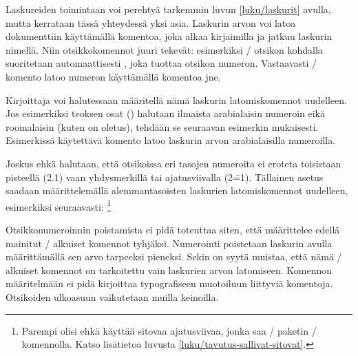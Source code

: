 Laskureiden toimintaan voi perehtyä tarkemmin luvun \ref{luku/laskurit}
avulla, mutta kerrataan tässä yhteydessä yksi asia. Laskurin arvon voi
latoa dokumenttiin käyttämällä komentoa, joka alkaa kirjaimilla
 ja jatkuu laskurin nimellä. Niin otsikkokomennot juuri
tekevät: esimerkiksi \-/ otsikon kohdalla suoritetaan
automaattisesti , joka tuottaa otsikon numeron.
Vastaavasti \-/ komento latoo numeron käyttämällä
komentoa  jne.

Kirjoittaja voi halutessaan määritellä nämä laskurin latomiskomennot
uudelleen. Jos esimerkiksi teoksen osat () halutaan
ilmaista arabialaisin numeroin eikä roomalaisin (kuten on oletus),
tehdään se seuraavan esimerkin mukaisesti. Esimerkissä käytettävä
komento  latoo laskurin arvon arabialaisilla numeroilla.

\begin{koodilohkosis}
\renewcommand{\thepart}{\arabic{part}}
\end{koodilohkosis}

Joskus ehkä halutaan, että otsikoissa eri tasojen numeroita ei eroteta
toisistaan pisteellä (2.1) vaan yhdysmerkillä tai ajatusviivalla
(2\==1). Tällainen asetus saadaan määrittelemällä alemmantasoisten
laskurien latomiskomennot uudelleen, esimerkiksi seuraavasti:%
\footnote{Parempi olisi ehkä käyttää sitovaa ajatusviivaa, jonka saa
  \-/ paketin \komento{==}\-/ komennolla. Katso
  lisätietoa luvusta \ref{luku/tavutus-sallivat-sitovat}.}

\begin{koodilohkosis}
\renewcommand{\thesubsection}{\thesection--\arabic{subsection}}
\renewcommand{\thesubsubsection}{%
  \thesubsection--\arabic{subsubsection}}
\end{koodilohkosis}

Otsikkonumeroinnin poistamista ei pidä toteuttaa siten, että määrittelee
edellä mainitut \-/ alkuiset komennot tyhjäksi. Numerointi
poistetaan laskurin  avulla määrittämällä sen arvo
tarpeeksi pieneksi. Sekin on syytä muistaa, että nämä \-/
alkuiset komennot on tarkoitettu vain laskurien arvon latomiseen.
Komennon määritelmään ei pidä kirjoittaa typografiseen muotoiluun
liittyviä komentoja. Otsikoiden ulkoasuun vaikutetaan muilla keinoilla.

